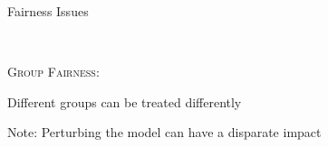 \documentclass[17pt,aspectratio=169]{beamer}
\begin{document}
\begin{frame}[t]{Fairness Issues}
\begin{minipage}{0.52\linewidth}
\begin{center}
    \end{center}
  \end{minipage}~~%
  \begin{minipage}{0.4\linewidth}
    \textsc{Group Fairness}:
    \begin{center}
      \small
      Different groups can be treated differently
    \end{center}

    \pause%
    \pause%
    \pause%
    \pause%
    \vspace{0.5em}

  \end{minipage}

  \vspace{0.5em}
  \begin{overlayarea}{\textwidth}{3cm}
  \begin{center}
    Note: Perturbing the model can have a disparate impact
  \end{center}
  \end{overlayarea}
\end{frame}
\end{document}
